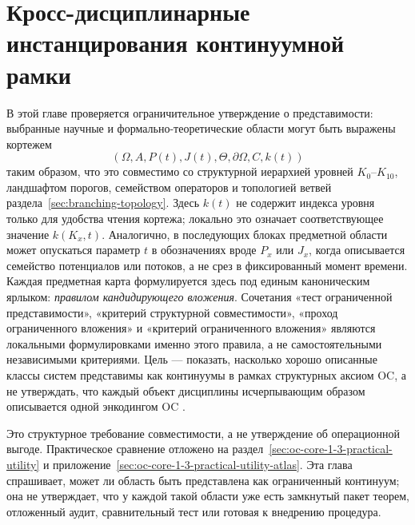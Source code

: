 
\section{Кросс-дисциплинарные инстанцирования континуумной рамки}
\label{sec:disciplines-extended}

В этой главе проверяется ограничительное утверждение о представимости:
выбранные научные и формально-теоретические области могут быть выражены
кортежем
\[
  (\Omega, A, P(t), J(t), \Theta, \partial\Omega, C, k(t))
\]
таким образом, что это совместимо со структурной иерархией уровней
\(K_0\)–\(K_{10}\), ландшафтом порогов, семейством операторов и топологией
ветвей раздела~\ref{sec:branching-topology}.
Здесь \(k(t)\) не содержит индекса уровня только для удобства чтения кортежа;
локально это означает соответствующее значение \(k(K_x,t)\).
Аналогично, в последующих блоках предметной области может опускаться
параметр \(t\) в обозначениях вроде \(P_x\) или \(J_x\), когда описывается
семейство потенциалов или потоков, а не срез в фиксированный момент времени.
Каждая предметная карта формулируется здесь под единым каноническим ярлыком:
\emph{правилом кандидирующего вложения}. Сочетания «тест ограниченной
представимости», «критерий структурной совместимости», «проход ограниченного
вложения» и «критерий ограниченного вложения» являются локальными
формулировками именно этого правила, а не самостоятельными независимыми
критериями. Цель — показать, насколько хорошо описанные классы систем
представимы как континуумы в рамках структурных аксиом OC, а не утверждать,
что каждый объект дисциплины исчерпывающим образом описывается одной
энкодингом OC \parencite{anderson_more_is_different}.

Это структурное требование совместимости, а не утверждение об
операционной выгоде. Практическое сравнение отложено на
раздел~\ref{sec:oc-core-1-3-practical-utility} и
приложение~\ref{sec:oc-core-1-3-practical-utility-atlas}.
Эта глава спрашивает, может ли область быть представлена как ограниченный
континуум; она не утверждает, что у каждой такой области уже есть замкнутый
пакет теорем, отложенный аудит, сравнительный тест или готовая к внедрению
процедура.

